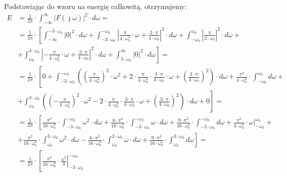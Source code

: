 \begin{task}
Podstawiając do wzoru na energię całkowitą, otrzymujemy:
\begin{align*}
E &= \frac{1}{2\pi} \cdot \int_{-\infty}^{\infty} \left|F(\jmath \omega)\right|^2 \cdot d\omega=\\
&= \frac{1}{2\pi} \cdot \left[\int_{-\infty}^{-3 \cdot \omega_0} \left|0\right|^2 \cdot d\omega + \int_{-3 \cdot \omega_0}^{-\omega_0} \left|\frac{\pi}{4 \cdot \omega_0^2} \cdot \omega + \frac{3 \cdot \pi}{4 \cdot \omega_0}\right|^2 \cdot d\omega + \int_{-\omega_0}^{\omega_0} \left|\frac{\pi}{2 \cdot \omega_0}\right|^2 \cdot d\omega\right.+\\
&\left.+\int_{\omega_0}^{3 \cdot \omega_0} \left|-\frac{\pi}{4 \cdot \omega_0^2} \cdot \omega + \frac{3 \cdot \pi}{4 \cdot \omega_0}\right|^2 \cdot d\omega + \int_{3 \cdot \omega_0}^{\infty} \left|0\right|^2 \cdot d\omega \right]=\\
&= \frac{1}{2\pi} \cdot \left[0 + \int_{-3 \cdot \omega_0}^{-\omega_0} \left(\left(\frac{\pi}{4 \cdot \omega_0^2}\right)^2 \cdot \omega^2 + 2 \cdot \frac{\pi}{4 \cdot \omega_0^2} \cdot \frac{3 \cdot \pi}{4 \cdot \omega_0} \cdot \omega + \left(\frac{3 \cdot \pi}{4 \cdot \omega_0}\right)^2\right) \cdot d\omega + \frac{\pi^2}{4 \cdot \omega_0^2}\cdot \int_{-\omega_0}^{\omega_0} d\omega\right.+\\
&\left.+ \int_{\omega_0}^{3 \cdot \omega_0} \left(\left(-\frac{\pi}{4 \cdot \omega_0^2}\right)^2 \cdot \omega^2 - 2 \cdot \frac{\pi}{4 \cdot \omega_0^2} \cdot \frac{3 \cdot \pi}{4 \cdot \omega_0} \cdot \omega + \left(\frac{3 \cdot \pi}{4 \cdot \omega_0}\right)^2\right) \cdot d\omega + 0 \right]=\\
&= \frac{1}{2\pi} \cdot \left[\frac{\pi^2}{16 \cdot \omega_0^4} \cdot \int_{-3 \cdot \omega_0}^{-\omega_0} \omega^2 \cdot d\omega + \frac{6 \cdot \pi^2}{16 \cdot \omega_0^3} \cdot \int_{-3 \cdot \omega_0}^{-\omega_0} \omega \cdot d\omega + \frac{9 \cdot \pi^2}{16 \cdot \omega_0^2} \cdot \int_{-3 \cdot \omega_0}^{-\omega_0} d\omega + \frac{\pi^2}{4 \cdot \omega_0^2}\cdot \left. \omega\right|_{-\omega_0}^{\omega_0}\right.+\\
&\left.+ \frac{\pi^2}{16 \cdot \omega_0^4} \cdot \int_{\omega_0}^{3 \cdot \omega_0} \omega^2 \cdot d\omega - \frac{6 \cdot \pi^2}{16 \cdot \omega_0^3} \cdot \int_{\omega_0}^{3 \cdot \omega_0} \omega \cdot d\omega + \frac{9 \cdot \pi^2}{16 \cdot \omega_0^2} \cdot \int_{\omega_0}^{3 \cdot \omega_0} d\omega \right]=\\
&= \frac{1}{2\pi} \cdot \left[\frac{\pi^2}{16 \cdot \omega_0^4} \cdot \left.\frac{\omega^3}{3}\right|_{-3 \cdot \omega_0}^{-\omega_0} 

\end{align*}
\end{task}
